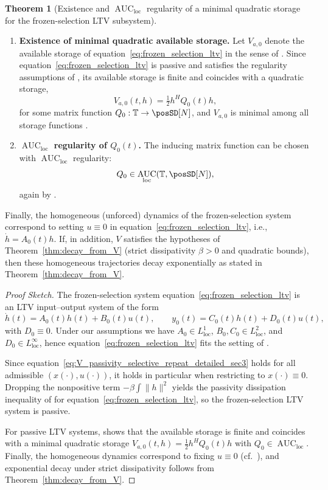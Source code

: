 \documentclass[10pt]{article} %
\def\eqref#1{equation~\ref{#1}}
\newcommand{\timeInt}{\mathbb T}                        %
\newcommand{\loc}{\mathrm{loc}}                         %
\DeclareMathOperator{\AUC}{AUC}                         %
\theoremstyle{definition}
\newtheorem{theorem}{Theorem}[section]
\begin{document}
\begin{theorem}[Existence and $\AUC_{\loc}$ regularity of a minimal quadratic storage for the frozen-selection LTV subsystem]
\begin{enumerate}[label=(\alph*)]
\item \textbf{Existence of minimal quadratic available storage.}
Let $V_{a,0}$ denote the available storage of \eqref{eq:frozen_selection_ltv} in the sense of \citet[Def.~4.1]{MorandinHinsen2024}. Since \eqref{eq:frozen_selection_ltv} is passive and satisfies the regularity assumptions of \citet[Eq.~(1)]{MorandinHinsen2024}, its available storage is finite and coincides with a quadratic storage,
\[
V_{a,0}(t,h)=\tfrac{1}{2}h^H Q_0(t)h,
\]
for some matrix function $Q_0:\timeInt\to\posSD[N]$, and $V_{a,0}$ is minimal among all storage functions
\citep[Cor.~4.3]{MorandinHinsen2024}.

\item \textbf{$\AUC_{\loc}$ regularity of $Q_0(t)$.}
The inducing matrix function can be chosen with $\AUC_{\loc}$ regularity:
\[
Q_0\in \AUC_{\loc}(\timeInt,\posSD[N]),
\]
again by \citet[Cor.~4.3]{MorandinHinsen2024}.
\end{enumerate}

Finally, the homogeneous (unforced) dynamics of the frozen-selection system correspond to setting $u\equiv 0$ in \eqref{eq:frozen_selection_ltv}, i.e., $\dot{h}=A_0(t)h$.
If, in addition, $V$ satisfies the hypotheses of Theorem~\ref{thm:decay_from_V} (strict dissipativity $\beta>0$ and quadratic bounds), then these homogeneous trajectories decay exponentially as stated in Theorem~\ref{thm:decay_from_V}.
\end{theorem}

\begin{proof}[Proof Sketch]
The frozen-selection system \eqref{eq:frozen_selection_ltv} is an LTV input--output system of the form
\[
\dot{h}(t)=A_0(t)h(t)+B_0(t)u(t),\qquad y_0(t)=C_0(t)h(t)+D_0(t)u(t),
\]
with $D_0\equiv 0$. Under our assumptions we have $A_0\in L^1_{\loc}$, $B_0,C_0\in L^2_{\loc}$, and $D_0\in L^\infty_{\loc}$, hence \eqref{eq:frozen_selection_ltv} fits the setting of \citet[Eq.~(1)]{MorandinHinsen2024}.

Since \eqref{eq:V_passivity_selective_repeat_detailed_sec3} holds for all admissible $(x(\cdot),u(\cdot))$, it holds in particular when restricting to $x(\cdot)\equiv 0$. Dropping the nonpositive term $-\beta\int\|h\|^2$ yields the passivity dissipation inequality of \citet[Def.~1.1]{MorandinHinsen2024} for \eqref{eq:frozen_selection_ltv}, so the frozen-selection LTV system is passive.

For passive LTV systems, \citet[Cor.~4.3]{MorandinHinsen2024} shows that the available storage \citep[Def.~4.1]{MorandinHinsen2024} is finite and coincides with a minimal quadratic storage $V_{a,0}(t,h)=\tfrac12 h^H Q_0(t)h$ with $Q_0\in \AUC_{\loc}$.
Finally, the homogeneous dynamics correspond to fixing $u\equiv 0$ (cf.\ \citet[Sec.~2.1]{MorandinHinsen2024}), and exponential decay under strict dissipativity follows from Theorem~\ref{thm:decay_from_V}.
\end{proof}
\end{document}
